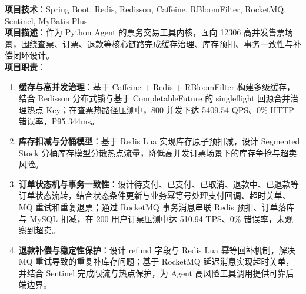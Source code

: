 \documentclass{resume}
\begin{document}
\textbf{项目技术}：Spring Boot, Redis, Redisson, Caffeine, RBloomFilter, RocketMQ, Sentinel, MyBatis-Plus\\
\textbf{项目描述}：作为 Python Agent 的票务交易工具内核，面向 12306 高并发售票场景，围绕查票、订票、退款等核心链路完成缓存治理、库存预扣、事务一致性与补偿闭环设计。\\
\textbf{项目职责}：
\begin{enumerate}[parsep=0.5ex]
    \item \textbf{缓存与高并发治理}：基于 Caffeine + Redis + RBloomFilter 构建多级缓存，结合 Redisson 分布式锁与基于 CompletableFuture 的 singleflight 回源合并治理热点 Key；在查票热路径压测中，800 并发下达 5409.54 QPS、0\% HTTP 错误率，P95 344ms。
    \item \textbf{库存扣减与分桶模型}：基于 Redis Lua 实现库存原子预扣减，设计 Segmented Stock 分桶库存模型分散热点流量，降低高并发订票场景下的库存争抢与超卖风险。
    \item \textbf{订单状态机与事务一致性}：设计待支付、已支付、已取消、退款中、已退款等订单状态流转，结合状态条件更新与业务幂等号处理支付回调、超时关单、MQ 重试和重复退票；通过 RocketMQ 事务消息串联 Redis 预扣、订单落库与 MySQL 扣减，在 200 用户订票压测中达 510.94 TPS、0\% 错误率，未观察到超卖。
    \item \textbf{退款补偿与稳定性保护}：设计 refund 字段与 Redis Lua 幂等回补机制，解决 MQ 重试导致的重复补库存问题；基于 RocketMQ 延迟消息实现超时关单，并结合 Sentinel 完成限流与热点保护，为 Agent 高风险工具调用提供可靠后端边界。
\end{enumerate}
\end{document}
